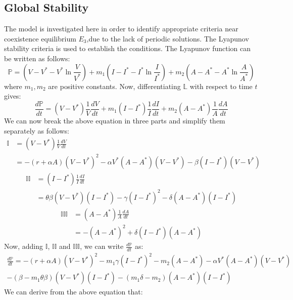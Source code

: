 \documentclass[12pt]{article}
\numberwithin{equation}{section}
\begin{document}
\subsection{Global Stability}
The model is investigated here in order to identify appropriate criteria near coexistence equilibrium $E_3$,due to the lack of periodic solutions. The Lyapunov stability criteria is used to establish the conditions.
The Lyapunov function can be written as follows:
\begin{equation}\label{sec3:e36}
\mathbb P = (V-V^*-V^*\ln\frac{V}{V^*})+m_1(I-I^*-I^*\ln\frac{I}{I^*})+m_2(A-A^*-A^*\ln\frac{A}{A^*})
\end{equation}
where $m_1,m_2$ are positive constants. Now, differentiating $\mathbb L$ with respect to time $t$ gives:
\begin{equation}\label{sec3:e37}
\frac{d\mathbb P}{dt}=(V-V^*)\frac{1}{V}\frac{dV}{dt} + m_1(I-I^*)\frac{1}{I}\frac{dI}{dt} + m_2 (A-A^*)\frac{1}{A}\frac{dA}{dt}
\end{equation}
We can now break the above equation in three parts and simplify them separately as follows:
\begin{align}\label{sec3:e38}
\mathbb I &=(V-V^*)\frac{1}{V}\frac{dV}{dt}\\
               &=-(r+\alpha A)(V-V^*)^2-\alpha V^*(A-A^*)(V-V^*)-\beta(I-I^*)(V-V^*)
\end{align}
\begin{align}\label{sec3:e39}
\mathbb {II} &=(I-I^*)\frac{1}{I}\frac{dI}{dt}\\
                   &=\theta\beta(V-V^*)(I-I^*)-\gamma(I-I^*)^2-\delta(A-A^*)(I-I^*)
\end{align}
\begin{align}\label{sec3:e40}
\mathbb {III} &=(A-A^*)\frac{1}{A}\frac{dA}{dt}\\
                    &=-(A-A^*)^2+\delta(I-I^*)(A-A^*)
\end{align}
Now, adding $\mathbb I$, $\mathbb{II}$ and $\mathbb{III}$, we can write $\frac{d \mathbb P}{dt}$ as:
\begin{equation}\label{sec3:e41}
\begin{split}
\frac{d\mathbb P}{dt} = -(r+\alpha A)(V-V^*)^2 - m_1\gamma(I-I^*)^2-m_2(A-A^*)-\alpha V^*(A-A^*)(V-V^*)\\ - (\beta-m_1\theta\beta)(V-V^*)(I-I^*) - (m_1\delta-m_2)(A-A^*)(I-I^*)
\end{split}
\end{equation}
We can derive from the above equation that:
\end{document}
